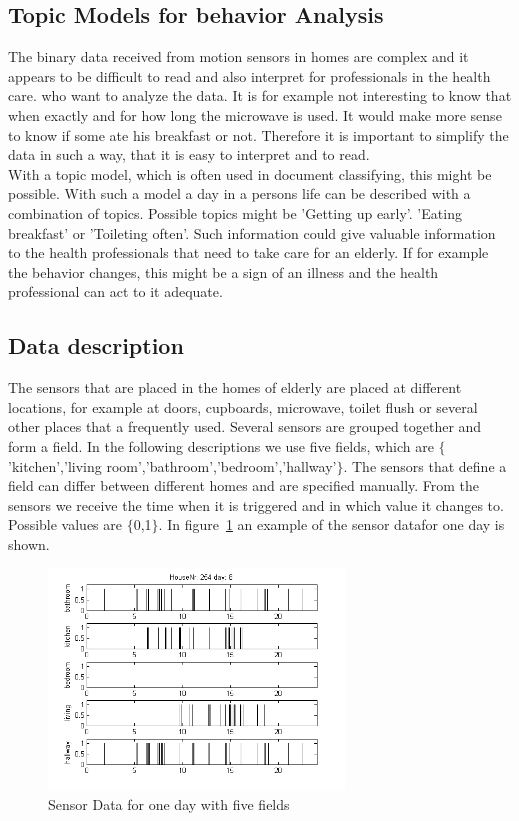 \documentclass[11pt,a4paper]{article}
\begin{document}
\subsection{Topic Models for behavior Analysis}
The binary data received from motion sensors in homes are complex and it appears to be difficult to read and also interpret for  professionals in the health care. who want to analyze the data. It is for example not interesting to know that when exactly and for how long the microwave is used. It would make more sense to know if some ate his breakfast or not.
Therefore it is important to simplify the data in such a way, that it is easy to interpret and to read.\\
With a topic model, which is often used in document classifying, this might be possible. With such a model a day in a persons life can be described with a combination of topics. Possible topics might be  'Getting up early'. 'Eating breakfast' or 'Toileting often'. Such information could give valuable information to the health professionals that need to take care for an elderly. If for example the behavior changes, this might be a sign of an illness and the health professional can act to it adequate.

\subsection{Data description}
The sensors that are placed in the homes of elderly are placed at different locations, for example at doors, cupboards, microwave, toilet flush or several other places that a frequently used. Several sensors are grouped together and form a field. In the following descriptions we use five fields, which are $\{$'kitchen','living room','bathroom','bedroom','hallway'$\}$. The sensors that define a field can differ between different homes and are specified manually.
From the sensors we receive the time when it is triggered and in which value it changes to. Possible values are $\{$0,1$\}$. In figure~\ref{fig:PlaineSensorData} an example of the sensor datafor one day is shown.\\

\begin{figure}[h!]
  \centering
    	\includegraphics[width=0.7\textwidth]{Pictures/plainDataExample.png}
    \caption{Sensor Data for one day with five fields}
    \label{fig:PlaineSensorData}
\end{figure}
\end{document}
